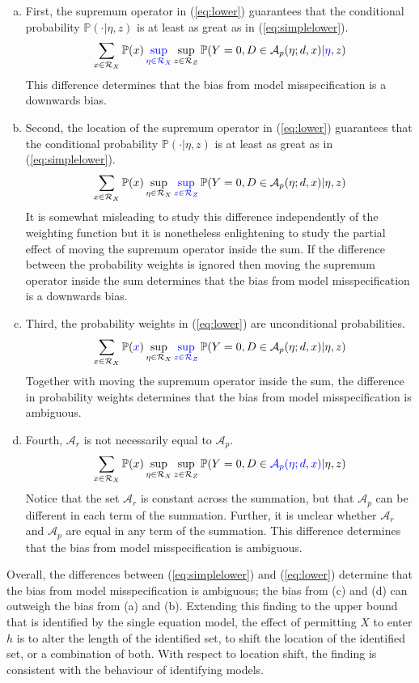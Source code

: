 \documentclass[10pt,a4paper,twoside]{article}
\numberwithin{equation}{section}
\begin{document}
\begin{enumerate}[(a)]
\item First, the supremum operator in (\ref{eq:lower}) guarantees that the conditional probability $\mathbb{P}(\cdot|\eta,z)$ is at least as great as in (\ref{eq:simplelower}).
\[\sum_{x\in\mathcal{R}_X}\mathbb{P}(\color{black}x\color{black})\color{blue}\sup_{\eta\in\mathcal{R}_X}\color{black}\sup_{z\in\mathcal{R}_Z}\color{black}\mathbb{P}(Y=0,D\in\color{black}\mathcal{A}_p(\eta;d,x)\color{black}|\color{blue}\eta\color{black},z)\]
This difference determines that the bias from model misspecification is a downwards bias. 
\item Second, the location of the supremum operator in (\ref{eq:lower}) guarantees that the conditional probability $\mathbb{P}(\cdot|\eta,z)$ is at least as great as in (\ref{eq:simplelower}).
\[\sum_{x\in\mathcal{R}_X}\mathbb{P}(\color{black}x\color{black})\color{black}\sup_{\eta\in\mathcal{R}_X}\color{blue}\sup_{z\in\mathcal{R}_Z}\color{black}\mathbb{P}(Y=0,D\in\color{black}\mathcal{A}_p(\eta;d,x)\color{black}|\color{black}\eta\color{black},z)\]
It is somewhat misleading to study this difference independently of the weighting function but it is nonetheless enlightening to study the partial effect of moving the supremum operator inside the sum. If the difference between the probability weights is ignored then moving the supremum operator inside the sum determines that the bias from model misspecification is a downwards bias.
\item Third, the probability weights in (\ref{eq:lower}) are unconditional probabilities.
\[\sum_{x\in\mathcal{R}_X}\mathbb{P}(\color{blue}x\color{black})\color{black}\sup_{\eta\in\mathcal{R}_X}\color{blue}\sup_{z\in\mathcal{R}_Z}\color{black}\mathbb{P}(Y=0,D\in\color{black}\mathcal{A}_p(\eta;d,x)\color{black}|\color{black}\eta\color{black},z)\]
Together with moving the supremum operator inside the sum, the difference in probability weights determines that the bias from model misspecification is ambiguous. 
\item Fourth, $\mathcal{A}_r$ is not necessarily equal to $\mathcal{A}_p$.
\[\sum_{x\in\mathcal{R}_X}\mathbb{P}(\color{black}x\color{black})\color{black}\sup_{\eta\in\mathcal{R}_X}\color{black}\sup_{z\in\mathcal{R}_Z}\color{black}\mathbb{P}(Y=0,D\in\color{blue}\mathcal{A}_p(\eta;d,x)\color{black}|\color{black}\eta\color{black},z)\] 
Notice that the set $\mathcal{A}_r$ is constant across the summation, but that $\mathcal{A}_p$ can be different in each term of the summation. Further, it is unclear whether $\mathcal{A}_r$ and $\mathcal{A}_p$ are equal in any term of the summation. This difference determines that the bias from model misspecification is ambiguous.
\end{enumerate} 
Overall, the  differences between (\ref{eq:simplelower}) and (\ref{eq:lower}) determine that the bias from model misspecification is ambiguous; the bias from (c) and (d) can outweigh the bias from (a) and (b). Extending this finding to the upper bound that is identified by the single equation model, the effect of permitting $X$ to enter $h$ is to alter the length of the identified set, to shift the location of the identified set, or a combination of both. With respect to location shift, the finding is consistent with the behaviour of identifying models.  
\end{document}
